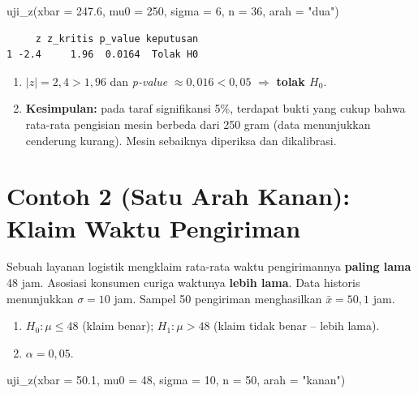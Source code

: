 \documentclass[
  indonesian,
  letterpaper,
]{book}
\newenvironment{Shaded}{\begin{snugshade}}{\end{snugshade}}
\newcommand{\AttributeTok}[1]{\textcolor[rgb]{0.40,0.45,0.13}{#1}}
\newcommand{\DecValTok}[1]{\textcolor[rgb]{0.68,0.00,0.00}{#1}}
\newcommand{\FloatTok}[1]{\textcolor[rgb]{0.68,0.00,0.00}{#1}}
\newcommand{\FunctionTok}[1]{\textcolor[rgb]{0.28,0.35,0.67}{#1}}
\newcommand{\NormalTok}[1]{\textcolor[rgb]{0.00,0.23,0.31}{#1}}
\newcommand{\StringTok}[1]{\textcolor[rgb]{0.13,0.47,0.30}{#1}}
\providecommand{\tightlist}{%
  \setlength{\itemsep}{0pt}\setlength{\parskip}{0pt}}
\begin{document}
\begin{Shaded}
\begin{Highlighting}[]
\FunctionTok{uji\_z}\NormalTok{(}\AttributeTok{xbar =} \FloatTok{247.6}\NormalTok{, }\AttributeTok{mu0 =} \DecValTok{250}\NormalTok{, }\AttributeTok{sigma =} \DecValTok{6}\NormalTok{, }\AttributeTok{n =} \DecValTok{36}\NormalTok{, }\AttributeTok{arah =} \StringTok{"dua"}\NormalTok{)}
\end{Highlighting}
\end{Shaded}

\begin{verbatim}
     z z_kritis p_value keputusan
1 -2.4     1.96  0.0164  Tolak H0
\end{verbatim}

\begin{enumerate}
\def\labelenumi{\arabic{enumi}.}
\setcounter{enumi}{3}
\tightlist
\item
  \(\lvert z \rvert = 2{,}4 > 1{,}96\) dan \emph{p-value}
  \(\approx 0{,}016 < 0{,}05\) \(\Rightarrow\) \textbf{tolak \(H_0\)}.
\item
  \textbf{Kesimpulan:} pada taraf signifikansi 5\%, terdapat bukti yang
  cukup bahwa rata-rata pengisian mesin berbeda dari 250 gram (data
  menunjukkan cenderung kurang). Mesin sebaiknya diperiksa dan
  dikalibrasi.
\end{enumerate}

\section{Contoh 2 (Satu Arah Kanan): Klaim Waktu
Pengiriman}\label{contoh-2-satu-arah-kanan-klaim-waktu-pengiriman}

Sebuah layanan logistik mengklaim rata-rata waktu pengirimannya
\textbf{paling lama} 48 jam. Asosiasi konsumen curiga waktunya
\textbf{lebih lama}. Data historis menunjukkan \(\sigma = 10\) jam.
Sampel 50 pengiriman menghasilkan \(\bar{x} = 50{,}1\) jam.

\begin{enumerate}
\def\labelenumi{\arabic{enumi}.}
\tightlist
\item
  \(H_0: \mu \le 48\) (klaim benar); \(H_1: \mu > 48\) (klaim tidak
  benar -- lebih lama).
\item
  \(\alpha = 0{,}05\).
\end{enumerate}

\begin{Shaded}
\begin{Highlighting}[]
\FunctionTok{uji\_z}\NormalTok{(}\AttributeTok{xbar =} \FloatTok{50.1}\NormalTok{, }\AttributeTok{mu0 =} \DecValTok{48}\NormalTok{, }\AttributeTok{sigma =} \DecValTok{10}\NormalTok{, }\AttributeTok{n =} \DecValTok{50}\NormalTok{, }\AttributeTok{arah =} \StringTok{"kanan"}\NormalTok{)}
\end{Highlighting}
\end{Shaded}
\end{document}
